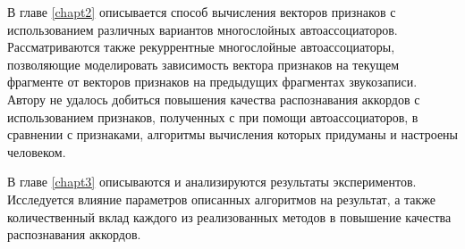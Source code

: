 В главе \ref{chapt2} описывается способ вычисления векторов признаков с
использованием различных вариантов многослойных автоассоциаторов.
Рассматриваются также рекуррентные многослойные автоассоциаторы, позволяющие
моделировать зависимость вектора признаков на текущем фрагменте от векторов
признаков на предыдущих фрагментах звукозаписи. Автору не удалось добиться
повышения качества распознавания аккордов с использованием признаков,
полученных с при помощи автоассоциаторов, в сравнении с признаками, алгоритмы
вычисления которых придуманы и настроены человеком.

В главе \ref{chapt3} описываются и анализируются результаты экспериментов.
Исследуется влияние параметров описанных алгоритмов на результат, а также
количественный вклад каждого из реализованных методов в повышение качества
распознавания аккордов.


% 





